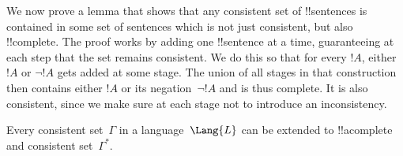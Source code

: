 \documentclass[../../../include/open-logic-section]{subfiles}
\begin{document}
      {}
      {}


\begin{explain}
We now prove a lemma that shows that any consistent set of
!!{sentence}s is contained in some set of sentences which is not just
consistent, but also !!{complete}. The proof works by adding one
!!{sentence} at a time, guaranteeing at each step that the set remains
consistent. We do this so that for every $!A$, either $!A$ or $\lnot
!A$ gets added at some stage. The union of all stages in that
construction then contains either $!A$ or its negation~$\lnot !A$ and
is thus complete. It is also consistent, since we make sure at each
stage not to introduce an inconsistency.
\end{explain}

\begin{lem}
 Every consistent
set~$\Gamma$ in a language~$\Lang{L}$ can be
extended to !!a{complete} and consistent set~$\Gamma^*$.
\end{lem}
\end{document}

